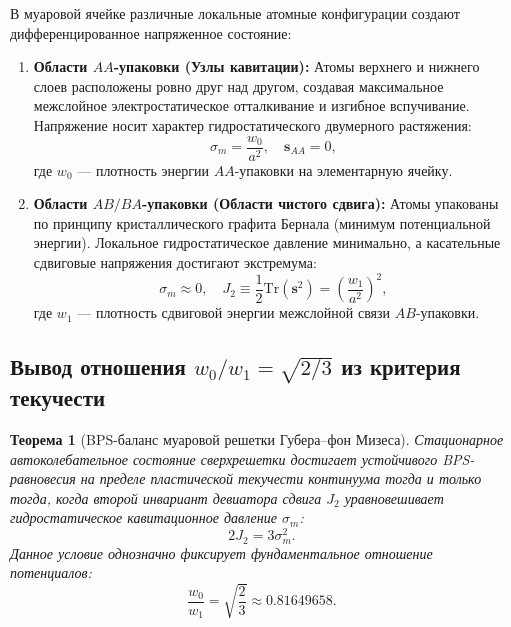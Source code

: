 \documentclass[12pt,a4paper]{article}
\newtheorem{theorem}{Теорема}
\begin{document}
	В муаровой ячейке различные локальные атомные конфигурации создают дифференцированное напряженное состояние:
	\begin{enumerate}
		\item \textbf{Области $AA$-упаковки (Узлы кавитации):} Атомы верхнего и нижнего слоев расположены ровно друг над другом, создавая максимальное межслойное электростатическое отталкивание и изгибное вспучивание. Напряжение носит характер гидростатического двумерного растяжения:
		\begin{equation}
			\sigma_m = \frac{w_0}{a^2}, \quad \mathbf{s}_{AA} = 0,
		\end{equation}
		где $w_0$ — плотность энергии $AA$-упаковки на элементарную ячейку.
		
		\item \textbf{Области $AB / BA$-упаковки (Области чистого сдвига):} Атомы упакованы по принципу кристаллического графита Бернала (минимум потенциальной энергии). Локальное гидростатическое давление минимально, а касательные сдвиговые напряжения достигают экстремума:
		\begin{equation}
			\sigma_m \approx 0, \quad J_2 \equiv \frac{1}{2}\mathrm{Tr}(\mathbf{s}^2) = \left( \frac{w_1}{a^2} \right)^2,
		\end{equation}
		где $w_1$ — плотность сдвиговой энергии межслойной связи $AB$-упаковки.
	\end{enumerate}
	
	\subsection{Вывод отношения $w_0/w_1 = \sqrt{2/3}$ из критерия текучести}
	\begin{theorem}[BPS-баланс муаровой решетки Губера--фон Мизеса]
		Стационарное автоколебательное состояние сверхрешетки достигает устойчивого BPS-равновесия на пределе пластической текучести континуума тогда и только тогда, когда второй инвариант девиатора сдвига $J_2$ уравновешивает гидростатическое кавитационное давление $\sigma_m$:
		\begin{equation}
			2 J_2 = 3 \sigma_m^2.
		\end{equation}
		Данное условие однозначно фиксирует фундаментальное отношение потенциалов:
		\begin{equation}
			\frac{w_0}{w_1} = \sqrt{\frac{2}{3}} \approx 0.81649658.
		\end{equation}
	\end{theorem}
	
\end{document}
